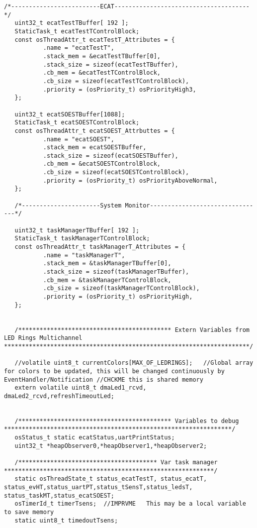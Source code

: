 \begin{lstlisting}[label=lst:generalSM,caption={Part of the code to declare threads and other auxiliar functions.}]
   /*-------------------------ECAT--------------------------------------*/
   uint32_t ecatTestTBuffer[ 192 ];
   StaticTask_t ecatTestTControlBlock;
   const osThreadAttr_t ecatTestT_Attributes = {
           .name = "ecatTestT",
           .stack_mem = &ecatTestTBuffer[0],
           .stack_size = sizeof(ecatTestTBuffer),
           .cb_mem = &ecatTestTControlBlock,
           .cb_size = sizeof(ecatTestTControlBlock),
           .priority = (osPriority_t) osPriorityHigh3,
   };
   
   uint32_t ecatSOESTBuffer[1088];
   StaticTask_t ecatSOESTControlBlock;
   const osThreadAttr_t ecatSOEST_Attrbuttes = {
           .name = "ecatSOEST",
           .stack_mem = ecatSOESTBuffer,
           .stack_size = sizeof(ecatSOESTBuffer),
           .cb_mem = &ecatSOESTControlBlock,
           .cb_size = sizeof(ecatSOESTControlBlock),
           .priority = (osPriority_t) osPriorityAboveNormal,
   };
   
   /*----------------------System Monitor--------------------------------*/
   
   uint32_t taskManagerTBuffer[ 192 ];
   StaticTask_t taskManagerTControlBlock;
   const osThreadAttr_t taskManagerT_Attributes = {
           .name = "taskManagerT",
           .stack_mem = &taskManagerTBuffer[0],
           .stack_size = sizeof(taskManagerTBuffer),
           .cb_mem = &taskManagerTControlBlock,
           .cb_size = sizeof(taskManagerTControlBlock),
           .priority = (osPriority_t) osPriorityHigh,
   };

  
   /******************************************* Extern Variables from LED Rings Multichannel *********************************************************************/
   
   //volatile uint8_t currentColors[MAX_OF_LEDRINGS];	//Global array for colors to be updated, this will be changed continuously by EventHandler/Notification //CHCKME this is shared memory
   extern volatile uint8_t dmaLed1_rcvd, dmaLed2_rcvd,refreshTimeoutLed;
  
   
   /******************************************* Variables to debug ****************************************************************/
   osStatus_t static ecatStatus,uartPrintStatus;
   uint32_t *heapObserver0,*heapObserver1,*heapObserver2;
   
   /*************************************** Var task manager ***********************************************************/
   static osThreadState_t status_ecatTestT, status_ecatT, status_evHT,status_uartPT,status_tSensT,status_ledsT, status_taskMT,status_ecatSOEST;
   osTimerId_t timerTsens;	//IMPRVME	This may be a local variable to save memory
   static uint8_t timedoutTsens;
   


\end{lstlisting}

